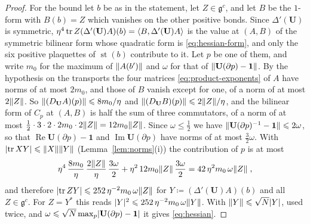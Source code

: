 \documentclass[11pt]{preprint}
\newcommand{\id}{\mathbf 1}
\newcommand{\re}{\operatorname{Re}}
\newcommand{\im}{\operatorname{Im}}
\DeclarePairedDelimiter{\abs}{\lvert}{\rvert}
\DeclarePairedDelimiter{\norm}{\lVert}{\rVert}
\numberwithin{equation}{section}
\begin{document}
\begin{proof}
For the bound let $b$ be as in the statement, let $Z \in \mathfrak g^c$, and let $B$ be the $1$-form with $B(b) = Z$ which vanishes on the other positive bonds. Since $\Delta'(\mathbf U)$ is symmetric, $\eta^4\operatorname{tr} Z(\Delta'(\mathbf U)A)(b) = \langle B, \Delta'(\mathbf U)A\rangle$ is the value at $(A, B)$ of the symmetric bilinear form whose quadratic form is \eqref{eq:hessian-form}, and only the six positive plaquettes of $\operatorname{st}(b)$ contribute to it. Let $p$ be one of them, and write $m_0$ for the maximum of $\norm{A(b')}$ and $\omega$ for that of $\norm{\mathbf U(\partial p) - \id}$. By the hypothesis on the transports the four matrices \eqref{eq:product-exponents} of $A$ have norms of at most $2m_0$, and those of $B$ vanish except for one, of a norm of at most $2\norm Z$. So $\norm{(D_{\mathbf U}A)(p)} \leqslant 8m_0/\eta$ and $\norm{(D_{\mathbf U}B)(p)} \leqslant 2\norm Z/\eta$, and the bilinear form of $C_p$ at $(A, B)$ is half the sum of three commutators, of a norm of at most $\frac{1}{2} \cdot 3 \cdot 2 \cdot 2m_0 \cdot 2\norm Z = 12m_0\norm Z$. Since $\omega \leqslant \frac{1}{2}$ we have $\norm{\mathbf U(\partial p)^{-1} - \id} \leqslant 2\omega$, so that $\re\mathbf U(\partial p) - \id$ and $\im\mathbf U(\partial p)$ have norms of at most $\frac{3}{2}\omega$. With $\abs{\tr XY} \leqslant \norm X\norm Y$ (Lemma~\ref{lem:norms}(i)) the contribution of $p$ is at most
\[
    \eta^4\,\frac{8m_0}{\eta}\,\frac{2\norm Z}{\eta}\,\frac{3\omega}{2} + \eta^2\,12m_0\norm Z\,\frac{3\omega}{2} = 42\,\eta^2m_0\,\omega\norm Z\;,
\]
and therefore $\abs{\tr ZY} \leqslant 252\,\eta^{-2}m_0\,\omega\norm Z$ for $Y \coloneqq (\Delta'(\mathbf U)A)(b)$ and all $Z \in \mathfrak g^c$. For $Z = Y^*$ this reads $\abs Y^2 \leqslant 252\,\eta^{-2}m_0\,\omega\norm Y$. With $\norm Y \leqslant \sqrt N\abs Y$, used twice, and $\omega \leqslant \sqrt N\max_p\abs{\mathbf U(\partial p) - \id}$ it gives \eqref{eq:hessian}.
\end{proof}
\end{document}
